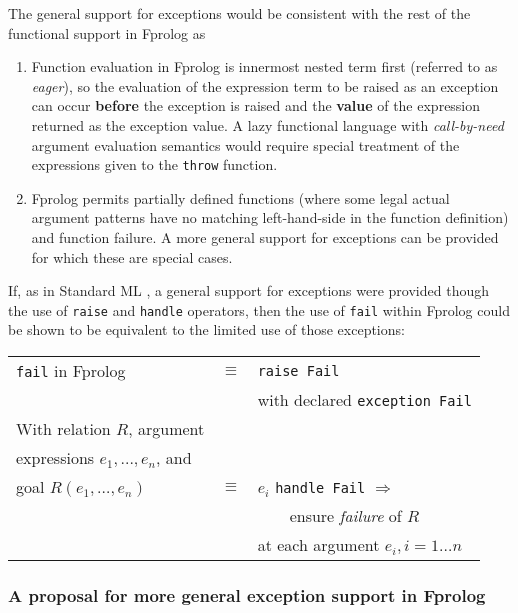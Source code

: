 \documentclass[a4paper,11pt,twoside]{article}
\begin{document}
The general support for exceptions would be consistent with the rest of the
functional support in Fprolog as
\begin{enumerate}
\item{Function evaluation in Fprolog is innermost nested term first (referred to
  as \textit{eager}), so 
  the evaluation of the expression term to be raised as an
  exception can occur \textbf{before} the exception is raised
  and the \textbf{value} of the expression returned as the
  exception value.  A lazy functional language with 
  \textit{call-by-need} argument evaluation semantics would require
  special treatment of the expressions given to the \texttt{throw}
  function.}
\item{Fprolog permits partially defined functions (where some
  legal actual argument patterns have no matching left-hand-side in
  the function definition) and function failure.
  A more general support for exceptions can be provided for
  which these are special cases.
  }
\end{enumerate}

If, as in Standard ML \cite{MTH90}, a general support for
exceptions were provided though the use of \texttt{raise} and
\texttt{handle} operators, then the use of \texttt{fail} within
Fprolog could be shown to be equivalent to the limited use of 
those exceptions:\\
\begin{tabular}{l l l}
\texttt{fail} in Fprolog      &$\equiv$ &\texttt{raise Fail}\\
                               &         &with declared \texttt{exception Fail}\\[4mm]
With relation $R$, argument    &         &\\
expressions $e_1,...,e_n$, and &         & \\
goal $R(e_1,\ldots,e_n)$       &$\equiv$ &$e_i$ \texttt{handle Fail} $\Rightarrow$\\
                               &         &~~~~ensure \textit{failure} of $R$\\
                               &         &at each argument $e_i, i=1\ldots n$\\
\end{tabular}

\subsubsection{A proposal for more general exception support in Fprolog}
\end{document}
